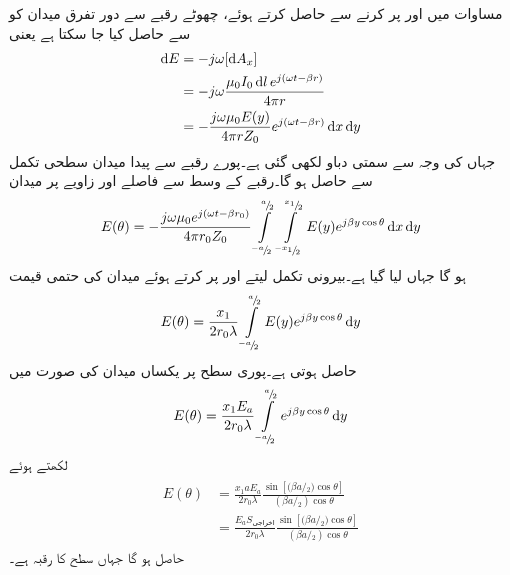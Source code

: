 مساوات  میں  اور  پر کرنے  سے  حاصل کرتے ہوئے، چھوٹے رقبے   سے دور تفرق میدان کو  سے حاصل کیا جا سکتا ہے یعنی
\begin{gather}
\begin{aligned}
\dif E &=-j \omega [\dif A_x] \\
&=-j \omega \frac{\mu_0 I_0 \dif l \, e^{j(\omega t -\beta r)}}{4\pi r}  \\
&=-\frac{j \omega \mu_0 E(y)}{4\pi r Z_0} e^{j(\omega t-\beta r)} \dif x \dif y
\end{aligned}
\end{gather}
جہاں  کی وجہ سے  سمتی دباو لکھی گئی ہے۔پورے رقبے  سے پیدا میدان سطحی تکمل سے حاصل ہو گا۔رقبے کے وسط سے  فاصلے اور  زاویے پر میدان
\begin{align}
E(\theta)=-\frac{j \omega \mu_0 e^{j(\omega t-\beta r_0)}}{4\pi r_0 Z_0} \int \limits_{^{-a}\!/\!_2}^{^a\!/\!_2} \int \limits_{^{-x_1}\!/\!_2}^{^{x_1}\!/\!_2} E(y) e^{j\beta y \cos \theta} \dif x \dif y
\end{align}
ہو گا جہاں  لیا گیا ہے۔بیرونی تکمل لیتے اور  پر کرتے ہوئے  میدان کی حتمی قیمت  
\begin{align}\label{مساوات_اینٹینا_فوریئر_تعلق_الف}
E(\theta)=\frac{x_1}{2 r_0 \lambda} \int \limits_{^{-a}\!/\!_2}^{^a\!/\!_2}  E(y) e^{j\beta y \cos \theta} \dif y
\end{align}
حاصل ہوتی ہے۔پوری سطح پر یکساں میدان  کی صورت میں
\begin{align}
E(\theta)=\frac{x_1 E_a}{2 r_0 \lambda} \int \limits_{^{-a}\!/\!_2}^{^a\!/\!_2}  e^{j\beta y \cos \theta} \dif y
\end{align}
لکھتے ہوئے
\begin{gather}
\begin{aligned}\label{مساوات_اینٹینا_سطحی_دور_میدان}
E(\theta)&=\frac{x_1 a E_a }{2 r_0 \lambda} \frac{\sin [{(\beta a}\!/\!_2)\cos \theta ]}{({\beta a}\!/\!_2)\cos \theta}\\
&=\frac{E_a S_{\text{اخراجی}}}{2 r_0 \lambda} \frac{\sin [{(\beta a}\!/\!_2)\cos \theta ]}{({\beta a}\!/\!_2)\cos \theta}
\end{aligned}
\end{gather}
حاصل ہو گا جہاں  سطح کا رقبہ ہے۔

